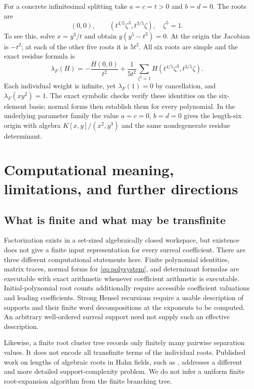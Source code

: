 \documentclass[11pt,letterpaper,oneside]{article}
\numberwithin{equation}{section}
\theoremstyle{definition}
\theoremstyle{remark}\newtheorem{remark}[theorem]{Remark}
\begin{document}
For a concrete infinitesimal splitting take $a=c=t>0$ and $b=d=0$.
The roots are
\begin{equation}\label{eq:sixroots}
 (0,0),\qquad
 (t^{4/5}\zeta^3,t^{3/5}\zeta),\quad \zeta^5=1.
\end{equation}
To see this, solve $x=y^3/t$ and obtain $y(y^5-t^3)=0$.
At the origin the Jacobian is $-t^2$; at each of the other five roots
it is $5t^2$. All six roots are simple and the exact residue formula is
\begin{equation}\label{eq:sixweights}
 \lambda_F(H)=-\frac{H(0,0)}{t^2}
 +\frac1{5t^2}\sum_{\zeta^5=1}
 H(t^{4/5}\zeta^3,t^{3/5}\zeta).
\end{equation}
Each individual weight is infinite, yet $\lambda_F(1)=0$ by cancellation,
and $\lambda_F(xy^2)=1$. The exact symbolic checks verify these identities
on the six-element basis; normal forms then establish them for every
polynomial. In the underlying parameter family the value $a=c=0$,
$b=d=0$ gives the length-six origin with algebra
$K[x,y]/(x^2,y^3)$ and the same nondegenerate residue determinant.

\section{Computational meaning, limitations, and further directions}\label{sec:limits}
\subsection{What is finite and what may be transfinite}
Factorization exists in a set-sized algebraically closed workspace, but
existence does not give a finite input representation for every surreal
coefficient. There are three different computational statements here.
Finite polynomial identities, matrix traces, normal forms for
\eqref{eq:polysystem}, and determinant formulas are executable with exact
arithmetic whenever coefficient arithmetic is executable. Initial-polynomial
root counts additionally require accessible coefficient valuations and
leading coefficients. Strong Hensel recursions require a usable description
of supports and their finite word decompositions at the exponents to be
computed. An arbitrary well-ordered surreal support need not supply such
an effective description.

Likewise, a finite root cluster tree records only finitely many pairwise
separation values. It does not encode all transfinite terms of the
individual roots. Published work on lengths of algebraic roots in Hahn
fields, such as \cite{KnightLange}, addresses a different and more detailed
support-complexity problem. We do not infer a uniform finite root-expansion
algorithm from the finite branching tree.
\end{document}

